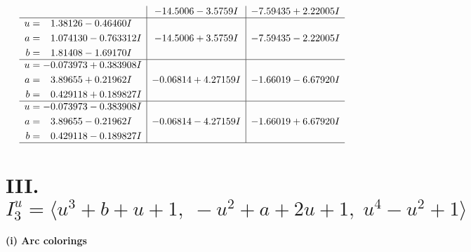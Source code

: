 \documentclass[1p]{elsarticle_modified}
\theoremstyle{definition}
\begin{document}
$$\begin{array}{c|c|c}
 & -14.5006 - 3.5759 I & -7.59435 + 2.22005 I \\ \hline\begin{aligned}
u &= \phantom{-}1.38126 - 0.46460 I \\
a &= \phantom{-}1.074130 - 0.763312 I \\
b &= \phantom{-}1.81408 - 1.69170 I\end{aligned}
 & -14.5006 + 3.5759 I & -7.59435 - 2.22005 I \\ \hline\begin{aligned}
u &= -0.073973 + 0.383908 I \\
a &= \phantom{-}3.89655 + 0.21962 I \\
b &= \phantom{-}0.429118 + 0.189827 I\end{aligned}
 & -0.06814 + 4.27159 I & -1.66019 - 6.67920 I \\ \hline\begin{aligned}
u &= -0.073973 - 0.383908 I \\
a &= \phantom{-}3.89655 - 0.21962 I \\
b &= \phantom{-}0.429118 - 0.189827 I\end{aligned}
 & -0.06814 - 4.27159 I & -1.66019 + 6.67920 I\\
 \hline 
 \end{array}$$\newpage\newpage\renewcommand{\arraystretch}{1}
\centering \section*{III. $I^u_{3}= \langle u^3+b+u+1,\;- u^2+a+2 u+1,\;u^4- u^2+1 \rangle$}
\flushleft \textbf{(i) Arc colorings}\\
\end{document}
